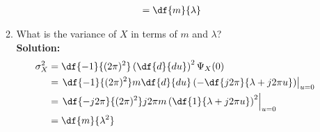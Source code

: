 \begin{enumerate}[1]
\begin{enumerate}
\begin{align*}
             & = \df{m}{\lambda}
    \end{align*}
  \item What is the variance of $X$ in terms of $m$ and $\lambda$?\\
    \textbf{Solution:}\\
    \begin{align*}
      \sigma_X^2 & = \df{-1}{(2\pi)^2}\left( \df{d}{du} \right)^2 \Psi_X(0) \\
                & = \left. \df{-1}{(2\pi)^2} m \df{d}{du} \left( - \df{j2\pi}{\lambda + j2\pi u} \right) \right|_{u=0} \\
                & = \left. \df{-j2\pi}{(2\pi)^2}j2\pi m \left( \df{1}{\lambda + j2\pi u} \right)^2 \right|_{u=0} \\
                & = \df{m}{\lambda^2}
    \end{align*}
  \end{enumerate}

\end{enumerate}
\vspace{.5in}


